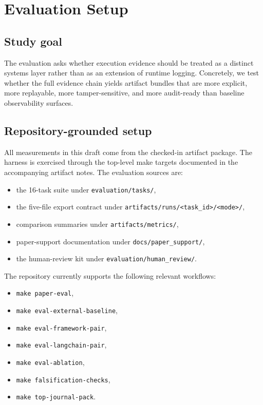 \section{Evaluation Setup}
\label{sec:evaluation}

\subsection{Study goal}

The evaluation asks whether execution evidence should be treated as a distinct systems layer rather than as an extension of runtime logging. Concretely, we test whether the full evidence chain yields artifact bundles that are more explicit, more replayable, more tamper-sensitive, and more audit-ready than baseline observability surfaces.

\subsection{Repository-grounded setup}

All measurements in this draft come from the checked-in artifact package. The harness is exercised through the top-level make targets documented in the accompanying artifact notes. The evaluation sources are:

\begin{itemize}
  \item the 16-task suite under \texttt{evaluation/tasks/},
  \item the five-file export contract under \texttt{artifacts/runs/<task\_id>/<mode>/},
  \item comparison summaries under \texttt{artifacts/metrics/},
  \item paper-support documentation under \texttt{docs/paper\_support/},
  \item the human-review kit under \texttt{evaluation/human\_review/}.
\end{itemize}

The repository currently supports the following relevant workflows:

\begin{itemize}
  \item \texttt{make paper-eval},
  \item \texttt{make eval-external-baseline},
  \item \texttt{make eval-framework-pair},
  \item \texttt{make eval-langchain-pair},
  \item \texttt{make eval-ablation},
  \item \texttt{make falsification-checks},
  \item \texttt{make top-journal-pack}.
\end{itemize}

